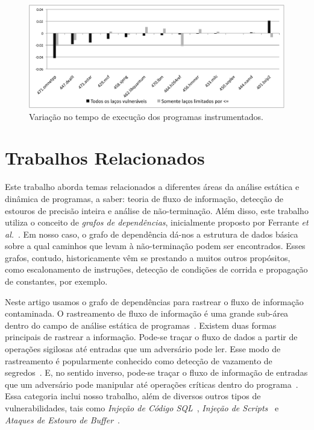 \documentclass{llncs}
\begin{document}
\begin{figure}[t!]
\begin{center}
\includegraphics[width=1\textwidth]{images/runtime}
\caption{Variação no tempo de execução dos programas instrumentados.}
\label{fig:runtime}
\end{center}
\end{figure}

\section{Trabalhos Relacionados}
\label{sec:rel}

Este trabalho aborda temas relacionados a diferentes áreas da análise estática
e dinâmica de programas, a saber: teoria de fluxo de informação, detecção de
estouros de precisão inteira e análise de não-terminação.
Além disso, este trabalho utiliza o conceito de {\em grafos de dependências},
inicialmente proposto por Ferrante {\em et al.}~\cite{Ferrante87}.
Em nosso caso, o grafo de dependência dá-nos a estrutura de dados básica sobre
a qual caminhos que levam à não-terminação podem ser encontrados.
Esses grafos, contudo, historicamente vêm se prestando a muitos outros
propósitos, como escalonamento de instruções, detecção de condições de corrida e
propagação de constantes, por exemplo.

Neste artigo usamos o grafo de dependências para rastrear o fluxo de
informação contaminada.
O rastreamento de fluxo de informação é uma grande sub-área dentro do campo de
análise estática de programas~\cite{Denning77}.
Existem duas formas principais de rastrear a informação.
Pode-se traçar o fluxo de dados a partir de operações sigilosas até entradas
que um adversário pode ler.
Esse modo de rastreamento é popularmente conhecido como detecção de vazamento
de segredos~\cite{Hammer06}.
E, no sentido inverso, pode-se traçar o fluxo de informação de entradas que
um adversário pode manipular até operações críticas dentro do
programa~\cite{Tripp09}.
Essa categoria inclui nosso trabalho, além de diversos outros tipos de
vulnerabilidades, tais como {\em Injeção de Código SQL}~\cite{Wassermann07},
{\em Injeção de Scripts}~\cite{Rimsa10} e {\em Ataques de Estouro de
Buffer}~\cite{Levy96}.
\end{document}
